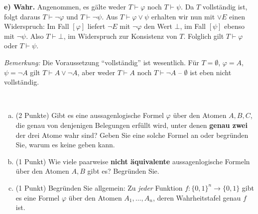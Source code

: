 \begin{loesung}
\textbf{e) Wahr.} Angenommen, es gälte weder $T\vdash\varphi$ noch $T\vdash\psi$. Da $T$ vollständig ist, folgt daraus $T\vdash\neg\varphi$ und $T\vdash\neg\psi$. Aus $T\vdash\varphi\vee\psi$ erhalten wir nun mit $\vee E$ einen Widerspruch: Im Fall $[\varphi]$ liefert $\neg E$ mit $\neg\varphi$ den Wert $\bot$, im Fall $[\psi]$ ebenso mit $\neg\psi$. Also $T\vdash\bot$, im Widerspruch zur Konsistenz von $T$. Folglich gilt $T\vdash\varphi$ oder $T\vdash\psi$.

\textit{Bemerkung:} Die Voraussetzung \enquote{vollständig} ist wesentlich. Für $T=\emptyset$, $\varphi=A$, $\psi=\neg A$ gilt $T\vdash A\vee\neg A$, aber weder $T\vdash A$ noch $T\vdash\neg A$ -- $\emptyset$ ist eben nicht vollständig.
\end{loesung}

\\
\begin{enumerate}[a)]
  \item (2 Punkte) Gibt es eine aussagenlogische Formel $\varphi$ über den Atomen $A, B, C$, die genau von denjenigen Belegungen erfüllt wird, unter denen \textbf{genau zwei} der drei Atome wahr sind? Geben Sie eine solche Formel an oder begründen Sie, warum es keine geben kann.
  \item (1 Punkt) Wie viele paarweise \textbf{nicht äquivalente} aussagenlogische Formeln über den Atomen $A, B$ gibt es? Begründen Sie.
  \item (1 Punkt) Begründen Sie allgemein: Zu \emph{jeder} Funktion $f:\{0,1\}^n\to\{0,1\}$ gibt es eine Formel $\varphi$ über den Atomen $A_1,\dots,A_n$, deren Wahrheitstafel genau $f$ ist.
\end{enumerate}


